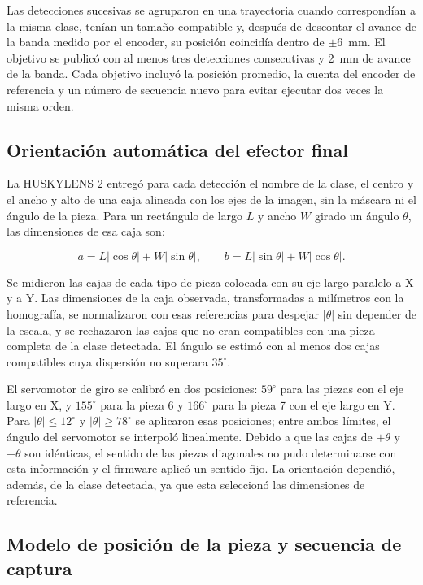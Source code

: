 Las detecciones sucesivas se agruparon en una trayectoria cuando correspondían a la misma clase, tenían un tamaño compatible y, después de descontar el avance de la banda medido por el encoder, su posición coincidía dentro de $\pm6$~mm. El objetivo se publicó con al menos tres detecciones consecutivas y 2~mm de avance de la banda. Cada objetivo incluyó la posición promedio, la cuenta del encoder de referencia y un número de secuencia nuevo para evitar ejecutar dos veces la misma orden.


\subsection{Orientación automática del efector final}

La HUSKYLENS 2 entregó para cada detección el nombre de la clase, el centro y el ancho y alto de una caja alineada con los ejes de la imagen, sin la máscara ni el ángulo de la pieza. Para un rectángulo de largo $L$ y ancho $W$ girado un ángulo $\theta$, las dimensiones de esa caja son:

\[
a = L\lvert\cos\theta\rvert + W\lvert\sin\theta\rvert,
\qquad
b = L\lvert\sin\theta\rvert + W\lvert\cos\theta\rvert.
\]

Se midieron las cajas de cada tipo de pieza colocada con su eje largo paralelo a X y a Y. Las dimensiones de la caja observada, transformadas a milímetros con la homografía, se normalizaron con esas referencias para despejar $\lvert\theta\rvert$ sin depender de la escala, y se rechazaron las cajas que no eran compatibles con una pieza completa de la clase detectada. El ángulo se estimó con al menos dos cajas compatibles cuya dispersión no superara $35^\circ$.

El servomotor de giro se calibró en dos posiciones: $59^\circ$ para las piezas con el eje largo en X, y $155^\circ$ para la pieza 6 y $166^\circ$ para la pieza 7 con el eje largo en Y. Para $\lvert\theta\rvert\le12^\circ$ y $\lvert\theta\rvert\ge78^\circ$ se aplicaron esas posiciones; entre ambos límites, el ángulo del servomotor se interpoló linealmente. Debido a que las cajas de $+\theta$ y $-\theta$ son idénticas, el sentido de las piezas diagonales no pudo determinarse con esta información y el firmware aplicó un sentido fijo. La orientación dependió, además, de la clase detectada, ya que esta seleccionó las dimensiones de referencia.


\subsection{Modelo de posición de la pieza y secuencia de captura}

